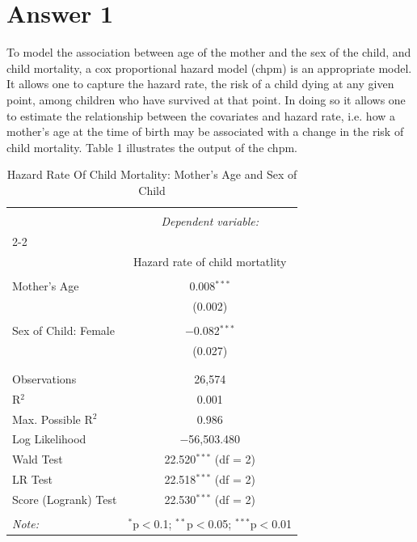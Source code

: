 \documentclass[12pt,letterpaper]{article}
\begin{document}
	\newpage
	
	\section*{Answer 1}
	\vspace{.25cm}
	
	To model the association between age of the mother and the sex of the child, and child mortality, a cox proportional hazard model (chpm) is an appropriate model. It allows one to capture the hazard rate, the risk of a child dying at any given point, among children who have survived at that point. In doing so it allows one to estimate the relationship between the covariates and hazard rate, i.e. how a mother's age at the time of birth may be associated with a change in the risk of child mortality. Table 1 illustrates the output of the chpm.
	
	
	
	
	\begin{table}[!htbp] \centering 
		\caption{Hazard Rate Of Child Mortality: Mother's Age and Sex of Child} 
		\label{} 
		\begin{tabular}{@{\extracolsep{5pt}}lc} 
			\\[-1.8ex]\hline 
			\hline \\[-1.8ex] 
			& \multicolumn{1}{c}{\textit{Dependent variable:}} \\ 
			\cline{2-2} 
			\\[-1.8ex] & Hazard rate of child mortatlity \\ 
			\hline \\[-1.8ex] 
			Mother's Age & 0.008$^{***}$ \\ 
			& (0.002) \\ 
			& \\ 
			Sex of Child: Female & $-$0.082$^{***}$ \\ 
			& (0.027) \\ 
			& \\ 
			\hline \\[-1.8ex] 
			Observations & 26,574 \\ 
			R$^{2}$ & 0.001 \\ 
			Max. Possible R$^{2}$ & 0.986 \\ 
			Log Likelihood & $-$56,503.480 \\ 
			Wald Test & 22.520$^{***}$ (df = 2) \\ 
			LR Test & 22.518$^{***}$ (df = 2) \\ 
			Score (Logrank) Test & 22.530$^{***}$ (df = 2) \\ 
			\hline 
			\hline \\[-1.8ex] 
			\textit{Note:}  & \multicolumn{1}{r}{$^{*}$p$<$0.1; $^{**}$p$<$0.05; $^{***}$p$<$0.01} \\ 
		\end{tabular} 
	\end{table}
	
\end{document}

